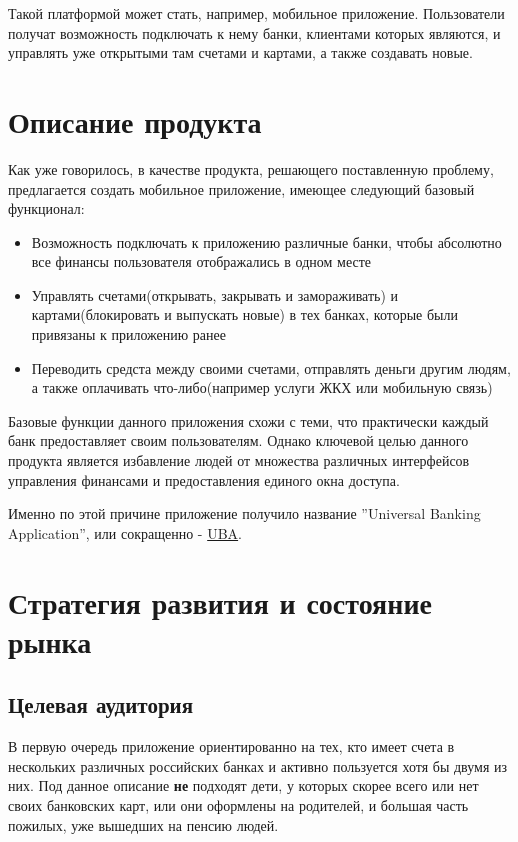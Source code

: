 \documentclass[a4paper,12pt]{article}
\begin{document}
    Такой платформой может стать, например, мобильное приложение.
    Пользователи получат возможность подключать к нему банки, клиентами которых 
    являются, и управлять уже открытыми там счетами и картами,
    а также создавать новые.

    \section{Описание продукта}

    Как уже говорилось, в качестве продукта, решающего
    поставленную проблему, предлагается создать мобильное
    приложение, имеющее следующий базовый функционал:

    \begin{itemize}
        \item {
            Возможность подключать к приложению различные банки,
            чтобы абсолютно все финансы пользователя отображались
            в одном месте
        }
        \item {
            Управлять счетами(открывать, закрывать и замораживать)
            и картами(блокировать и выпускать новые) в тех банках,
            которые были привязаны к приложению ранее
        }
        \item {
            Переводить средста между своими счетами,
            отправлять деньги другим людям, а также оплачивать
            что-либо(например услуги ЖКХ или мобильную связь)
        }
    \end{itemize}

    Базовые функции данного приложения схожи с теми, что
    практически каждый банк предоставляет своим пользователям.
    Однако ключевой целью данного продукта является
    избавление людей от множества различных интерфейсов управления
    финансами и предоставления единого окна доступа.

    Именно по этой причине приложение получило название
    ''Universal Banking Application'', или сокращенно - \underline{UBA}.

    \section{Стратегия развития и состояние рынка}

    \subsection{Целевая аудитория}
    
    В первую очередь приложение ориентированно на тех, кто имеет
    счета в нескольких различных российских банках и активно пользуется хотя
    бы двумя из них. Под данное описание \textbf{не} подходят
    дети, у которых скорее всего или нет своих банковских карт, или
    они оформлены на родителей, и большая часть пожилых, уже вышедших на пенсию людей. 
\end{document}
